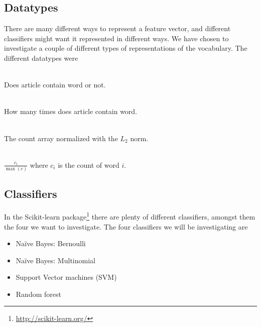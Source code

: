 \subsection{Datatypes}
There are many different ways to represent a feature vector, and different classifiers might want it represented in different ways. We have chosen to investigate a couple of different types of representations of the vocabulary. The different datatypes were
\begin{description}
\item[Binary:]\ \\Does article contain word or not.
\item[Count:]\ \\How many times does article contain word.
\item[$L_2$-normalized:]\ \\ The count array normalized with the $L_2$ norm. 
\item[Mapped value from 0 to 1:]\ \\ $\frac{c_i}{\max(c)}$ where $c_i$ is the count of word $i$.
\end{description}

\subsection{Classifiers}
In the Scikit-learn package\footnote{\url{http://scikit-learn.org/}} there are plenty of different classifiers, amongst them the four we want to investigate. The four classifiers we will be investigating are
\begin{itemize}[noitemsep,nolistsep]
\item Naïve Bayes: Bernoulli
\item Naïve Bayes: Multinomial
\item Support Vector machines (SVM)
\item Random forest 
\end{itemize}